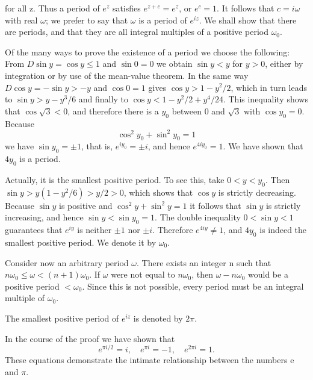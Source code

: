 for all z. Thus a period of $e^{z}$ satisfies $e^{z+c} = e^{z}$, or $e^{c} = 1$. It follows that $c = i\omega$ with real $\omega$; we prefer to say that $\omega$ is a period of $e^{iz}$. We shall show that there are periods, and that they are all integral multiples of a positive period $\omega_{0}$.

Of the many ways to prove the existence of a period we choose the following: From $D \sin y = \cos y \leq 1$ and $\sin 0 = 0$ we obtain $\sin y < y$ for $y > 0$, either by integration or by use of the mean-value theorem. In the same way $D \cos y = -\sin y > -y$ and $\cos 0 = 1$ gives $\cos y > 1 - y^2 / 2$, which in turn leads to $\sin y > y - y^3 / 6$ and finally to $\cos y < 1 - y^2 / 2 + y^4 / 24$. This inequality shows that $\cos \sqrt{3} < 0$, and therefore there is a $y_0$ between 0 and $\sqrt{3}$ with $\cos y_0 = 0$. Because
\begin{equation*}
\cos^ {2} y _ {0} + \sin^ {2} y _ {0} = 1
\end{equation*}
we have $\sin y_{0} = \pm1$, that is, $e^{iy_{0}} = \pm i$, and hence $e^{4iy_{0}} = 1$. We have shown that $4y_{0}$ is a period.

Actually, it is the smallest positive period. To see this, take $0 < y < y_0$. Then $\sin y > y(1-y^2/6) > y/2 > 0$, which shows that $\cos y$ is strictly decreasing. Because $\sin y$ is positive and $\cos^2 y + \sin^2 y = 1$ it follows that $\sin y$ is strictly increasing, and hence $\sin y < \sin y_0 = 1$. The double inequality $0 < \sin y < 1$ guarantees that $e^{iy}$ is neither $\pm1$ nor $\pm i$. Therefore $e^{4iy} \ne 1$, and $4y_0$ is indeed the smallest positive period. We denote it by $\omega_0$.

Consider now an arbitrary period $\omega$. There exists an integer n such that $n\omega_{0} \leq \omega < (n + 1)\omega_{0}$. If $\omega$ were not equal to $n\omega_{0}$, then $\omega - n\omega_{0}$ would be a positive period $< \omega_{0}$. Since this is not possible, every period must be an integral multiple of $\omega_{0}$.

The smallest positive period of $e^{iz}$ is denoted by $2\pi$.

In the course of the proof we have shown that
\begin{equation*}
e ^ {\pi i / 2} = i, \quad e ^ {\pi i} = - 1, \quad e ^ {2 \pi i} = 1.
\end{equation*}
These equations demonstrate the intimate relationship between the numbers e and $\pi$.

